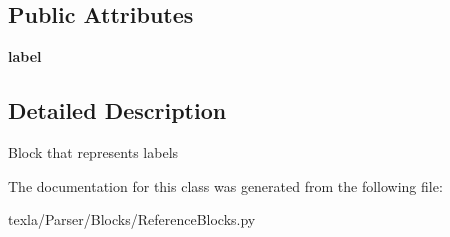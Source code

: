 \subsection*{Public Attributes}
\begin{DoxyCompactItemize}
\item 
\hypertarget{classtexla_1_1Parser_1_1Blocks_1_1ReferenceBlocks_1_1LabelBlock_af85aa3c1e5b6ca49e436b4daedc8fe2f}{}\label{classtexla_1_1Parser_1_1Blocks_1_1ReferenceBlocks_1_1LabelBlock_af85aa3c1e5b6ca49e436b4daedc8fe2f} 
{\bfseries label}
\end{DoxyCompactItemize}


\subsection{Detailed Description}
\begin{DoxyVerb}Block that represents labels\end{DoxyVerb}
 

The documentation for this class was generated from the following file\+:\begin{DoxyCompactItemize}
\item 
texla/\+Parser/\+Blocks/Reference\+Blocks.\+py\end{DoxyCompactItemize}
